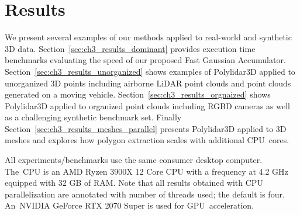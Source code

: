     







\section{Results}\label{sec:ch3_results}

We present several examples of our methods applied to real-world and synthetic 3D data. Section~\ref{sec:ch3_results_dominant} provides execution time benchmarks evaluating the speed of our proposed Fast Gaussian Accumulator. Section~\ref{sec:ch3_results_unorganized} shows examples of Polylidar3D applied to unorganized 3D points including airborne LiDAR point clouds and point clouds generated on a moving vehicle.  Section~\ref{sec:ch3_results_orgnaized} shows Polylidar3D applied to organized point clouds including \ac{RGBD} cameras as well as a challenging synthetic benchmark set. Finally Section~\ref{sec:ch3_results_meshes_parallel} presents Polylidar3D applied to 3D meshes and explores how polygon extraction scales with additional CPU~cores. 

All experiments/benchmarks use the same consumer desktop computer. The~CPU is an AMD Ryzen 3900X 12 Core CPU with a frequency at 4.2 GHz equipped with 32 GB of RAM.  Note that all results obtained with CPU parallelization are annotated with number of threads used; the default is four. An~NVIDIA GeForce RTX 2070 Super is used for \ac{GPU}~acceleration.


